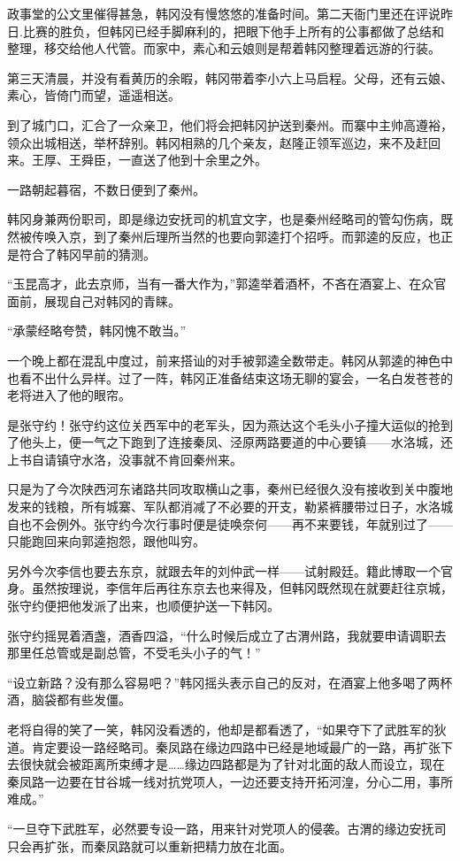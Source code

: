 政事堂的公文里催得甚急，韩冈没有慢悠悠的准备时间。第二天衙门里还在评说昨日.比赛的胜负，但韩冈已经手脚麻利的，把眼下他手上所有的公事都做了总结和整理，移交给他人代管。而家中，素心和云娘则是帮着韩冈整理着远游的行装。

第三天清晨，并没有看黄历的余暇，韩冈带着李小六上马启程。父母，还有云娘、素心，皆倚门而望，遥遥相送。

到了城门口，汇合了一众亲卫，他们将会把韩冈护送到秦州。而寨中主帅高遵裕，领众出城相送，举杯辞别。韩冈相熟的几个亲友，赵隆正领军巡边，来不及赶回来。王厚、王舜臣，一直送了他到十余里之外。

一路朝起暮宿，不数日便到了秦州。

韩冈身兼两份职司，即是缘边安抚司的机宜文字，也是秦州经略司的管勾伤病，既然被传唤入京，到了秦州后理所当然的也要向郭逵打个招呼。而郭逵的反应，也正是符合了韩冈早前的猜测。

“玉昆高才，此去京师，当有一番大作为，”郭逵举着酒杯，不吝在酒宴上、在众官面前，展现自己对韩冈的青睐。

“承蒙经略夸赞，韩冈愧不敢当。”

一个晚上都在混乱中度过，前来搭讪的对手被郭逵全数带走。韩冈从郭逵的神色中也看不出什么异样。过了一阵，韩冈正准备结束这场无聊的宴会，一名白发苍苍的老将进入了他的眼帘。

是张守约！张守约这位关西军中的老军头，因为燕达这个毛头小子撞大运似的抢到了他头上，便一气之下跑到了连接秦凤、泾原两路要道的中心要镇——水洛城，还上书自请镇守水洛，没事就不肯回秦州来。

只是为了今次陕西河东诸路共同攻取横山之事，秦州已经很久没有接收到关中腹地发来的钱粮，所有城寨、军队都消减了不必要的开支，勒紧裤腰带过日子，水洛城自也不会例外。张守约今次行事时便是徒唤奈何——再不来要钱，年就别过了——只能跑回来向郭逵抱怨，跟他叫穷。

另外今次李信也要去东京，就跟去年的刘仲武一样——试射殿廷。籍此博取一个官身。虽然按理说，李信年后再往东京去也来得及，但韩冈既然现在就要赶往京城，张守约便把他发派了出来，也顺便护送一下韩冈。

张守约摇晃着酒盏，酒香四溢，“什么时候后成立了古渭州路，我就要申请调职去那里任总管或是副总管，不受毛头小子的气！”

“设立新路？没有那么容易吧？”韩冈摇头表示自己的反对，在酒宴上他多喝了两杯酒，脑袋都有些发僵。

老将自得的笑了一笑，韩冈没看透的，他却是都看透了，“如果夺下了武胜军的狄道。肯定要设一路经略司。秦凤路在缘边四路中已经是地域最广的一路，再扩张下去很快就会被距离所束缚才是……缘边四路都是为了针对北面的敌人而设立，现在秦凤路一边要在甘谷城一线对抗党项人，一边还要支持开拓河湟，分心二用，事所难成。”

“一旦夺下武胜军，必然要专设一路，用来针对党项人的侵袭。古渭的缘边安抚司只会再扩张，而秦凤路就可以重新把精力放在北面。

